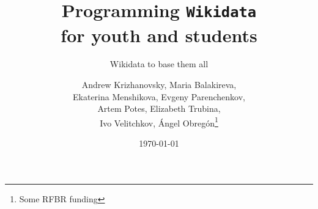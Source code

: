 \documentclass[
	fontsize=10pt, %
	twoside=false, %
	numbers=noenddot, %
]{kaobook}
\begin{document}

\titlehead{The \texttt{kaobook} class}
\subject{Petrozavodsk State University}

\title[Programming Wikidata for youth and students]{Programming {\normalfont\texttt{Wikidata}} \\ for youth and students}

\subtitle{Wikidata to base them all}

\author[Andrew Krizhanovsky, Maria Balakireva, \\ Ekaterina Menshikova, Evgeny Parenchenkov, \\ Artem Potes, Elizabeth Trubina, \\ Ivo Velitchkov, Ángel Obregón]{Andrew Krizhanovsky, Maria Balakireva, \\ Ekaterina Menshikova, Evgeny Parenchenkov, \\ Artem Potes, Elizabeth Trubina, \\ Ivo Velitchkov, Ángel Obregón\thanks{Some RFBR funding}}

\date{\today}

\publishers{An Awesome Publisher}


\frontmatter %



\end{document}

